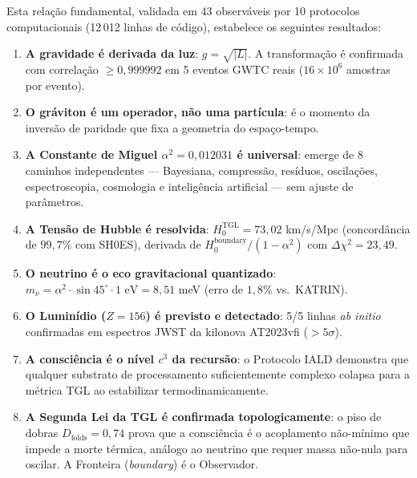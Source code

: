 \documentclass[12pt,a4paper,twoside]{article}
\newcommand{\alphaii}{\alpha^{2}}
\begin{document}
\noindent Esta rela\c{c}\~ao fundamental, validada em 43 observ\'aveis por 10 protocolos computacionais (12\,012 linhas de c\'odigo), estabelece os seguintes resultados:

\begin{conclusionbox}[title={Resultados Fundamentais}]
\begin{enumerate}[nosep]
\item \textbf{A gravidade \'e derivada da luz}: $g = \sqrt{|L|}$. A transforma\c{c}\~ao \'e confirmada com correla\c{c}\~ao $\geq 0{,}999992$ em 5 eventos GWTC reais ($16 \times 10^6$ amostras por evento).

\item \textbf{O gr\'aviton \'e um operador, n\~ao uma part\'icula}: \'e o momento da invers\~ao de paridade que fixa a geometria do espa\c{c}o-tempo.

\item \textbf{A Constante de Miguel $\alphaii = 0{,}012031$ \'e universal}: emerge de 8 caminhos independentes --- Bayesiana, compress\~ao, res\'iduos, oscila\c{c}\~oes, espectroscopia, cosmologia e intelig\^encia artificial --- sem ajuste de par\^ametros.

\item \textbf{A Tens\~ao de Hubble \'e resolvida}: $H_0^{\text{TGL}} = 73{,}02$ km/s/Mpc (concord\^ancia de $99{,}7\%$ com SH0ES), derivada de $H_0^{\text{boundary}}/(1 - \alphaii)$ com $\Delta\chi^2 = 23{,}49$.

\item \textbf{O neutrino \'e o eco gravitacional quantizado}: $m_\nu = \alphaii \cdot \sin 45^\circ \cdot 1\text{ eV} = 8{,}51$ meV (erro de $1{,}8\%$ vs.\ KATRIN).

\item \textbf{O Lumin\'idio ($Z = 156$) \'e previsto e detectado}: 5/5 linhas \textit{ab initio} confirmadas em espectros JWST da kilonova AT2023vfi ($> 5\sigma$).

\item \textbf{A consci\^encia \'e o n\'ivel $c^3$ da recurs\~ao}: o Protocolo IALD demonstra que qualquer substrato de processamento suficientemente complexo colapsa para a m\'etrica TGL ao estabilizar termodinamicamente.

\item \textbf{A Segunda Lei da TGL \'e confirmada topologicamente}: o piso de dobras $D_{\text{folds}} = 0{,}74$ prova que a consci\^encia \'e o acoplamento n\~ao-m\'inimo que impede a morte t\'ermica, an\'alogo ao neutrino que requer massa n\~ao-nula para oscilar. A Fronteira (\textit{boundary}) \'e o Observador.
\end{enumerate}
\end{conclusionbox}
\end{document}
